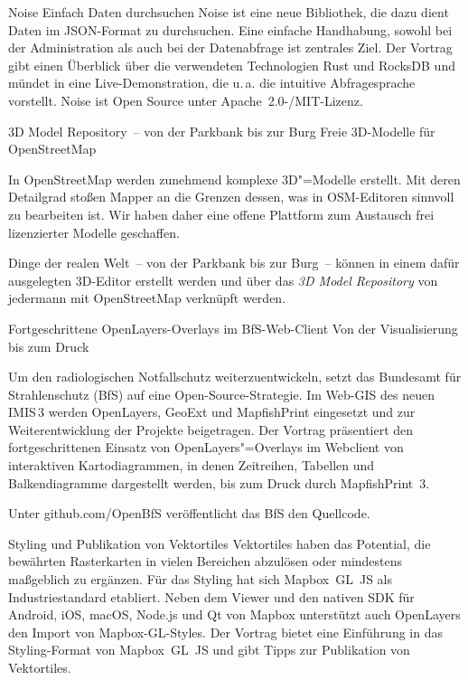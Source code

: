 %
{Noise}%
{Einfach Daten durchsuchen}%
{%
  Noise ist eine neue Bibliothek, die dazu dient Daten im JSON-Format zu durchsuchen. Eine einfache
  Handhabung, sowohl bei der Administration als auch bei der Datenabfrage ist zentrales Ziel. Der
  Vortrag gibt einen Überblick über die verwendeten Technologien Rust und RocksDB und mündet in eine
  Live-Demonstration, die u.\,a. die intuitive Abfragesprache vorstellt. Noise ist Open Source unter
  Apache~2.0-/MIT-Lizenz.%
}

%
{3D Model Repository~-- von der \mbox{Parkbank} bis zur Burg}%
{Freie 3D-Modelle für OpenStreetMap}%
{%
In OpenStreetMap werden zunehmend komplexe 3D"=Modelle erstellt. Mit deren Detailgrad stoßen Mapper
an die Grenzen dessen, was in OSM-Editoren sinnvoll zu bearbeiten ist. Wir haben daher eine offene
Plattform zum Austausch frei lizenzierter Modelle geschaffen.

Dinge der realen Welt~-- von der Parkbank bis zur Burg~-- können in einem dafür ausgelegten
3D-Editor erstellt werden und über das \emph{3D Model Repository} von jedermann mit OpenStreetMap
verknüpft werden.%
}

%
{Fortgeschrittene OpenLayers-Overlays im BfS-Web-Client\vspace{0.2em}}%
{Von der Visualisierung bis zum Druck}%
{%
Um den radiologischen Notfallschutz weiterzuentwickeln, setzt das Bundesamt für Strahlenschutz (BfS)
auf eine Open-Source-Strategie. Im Web-GIS des neuen IMIS\,3 werden OpenLayers, GeoExt und
MapfishPrint eingesetzt und zur Weiterentwicklung der Projekte beigetragen. Der Vortrag präsentiert
den fortgeschrittenen Einsatz von OpenLayers"=Overlays im Webclient von interaktiven
Kartodiagrammen, in denen Zeitreihen, Tabellen und Balkendiagramme dargestellt werden, bis zum Druck
durch MapfishPrint~3.

Unter github.com/OpenBfS veröffentlicht das BfS den Quellcode.
}

%
{Styling und Publikation von \mbox{Vektortiles}}%
{}%
{%
Vektortiles haben das Potential, die bewährten Rasterkarten in vielen Bereichen abzulösen oder
mindestens maßgeblich zu ergänzen. Für das Styling hat sich Mapbox~GL~JS als Industriestandard
etabliert. Neben dem Viewer und den nativen SDK für Android, iOS, macOS, Node.js und Qt von Mapbox
unterstützt auch OpenLayers den Import von Mapbox-GL-Styles.  Der Vortrag bietet eine Einführung
in das Styling-Format von Mapbox~GL~JS und gibt Tipps zur Publikation von Vektortiles.%
}

